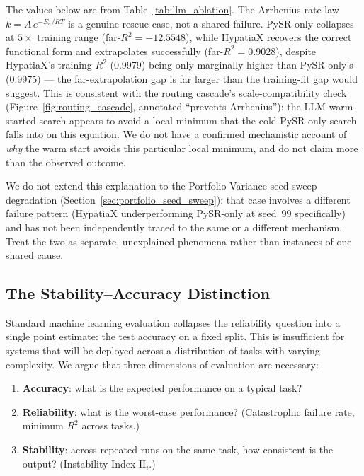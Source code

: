 \documentclass[twoside,11pt]{article}
\newcommand{\Rsq}{R^{2}}
\newcommand{\II}{\mathrm{II}}
\begin{document}
The values below are from Table~\ref{tab:llm_ablation}. The Arrhenius rate law $k = A\,e^{-E_a / RT}$
is a genuine rescue case, not a shared failure. PySR-only collapses at
$5\times$ training range (far-$\Rsq = -12.5548$), while HypatiaX recovers
the correct functional form and extrapolates successfully (far-$\Rsq =
0.9028$), despite HypatiaX's training $\Rsq$ (0.9979) being only marginally
higher than PySR-only's (0.9975) --- the far-extrapolation gap is far larger
than the training-fit gap would suggest. This is consistent with the
routing cascade's scale-compatibility check (Figure~\ref{fig:routing_cascade},
annotated ``prevents Arrhenius''): the LLM-warm-started search appears to
avoid a local minimum that the cold PySR-only search falls into on this
equation. We do not have a confirmed mechanistic account of \emph{why} the
warm start avoids this particular local minimum, and do not claim more than
the observed outcome.

We do not extend this explanation to the Portfolio Variance seed-sweep
degradation (Section~\ref{sec:portfolio_seed_sweep}): that case involves a
different failure pattern (HypatiaX underperforming PySR-only at seed~99
specifically) and has not been independently traced to the same or a
different mechanism. Treat the two as separate, unexplained phenomena
rather than instances of one shared cause.

\subsection{The Stability--Accuracy Distinction}\label{subsec:the-stabilityaccuracy-distinction}
\label{sec:disc_stability}

Standard machine learning evaluation collapses the reliability question into a
single point estimate: the test accuracy on a fixed split.  This is insufficient
for systems that will be deployed across a distribution of tasks with varying
complexity.  We argue that three dimensions of evaluation are necessary:
\begin{enumerate}[leftmargin=2em,label=(\roman*)]
  \item \textbf{Accuracy}: what is the expected performance on a typical task?
  \item \textbf{Reliability}: what is the worst-case performance?
    (Catastrophic failure rate, minimum $\Rsq$ across tasks.)
  \item \textbf{Stability}: across repeated runs on the same task, how consistent
    is the output?  (Instability Index $\II_i$.)
\end{enumerate}
\end{document}
